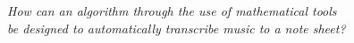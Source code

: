 \begin{center}
\textit{How can an algorithm through the use of mathematical tools \\
be designed to automatically transcribe music to a note sheet?}
\end{center}
%
